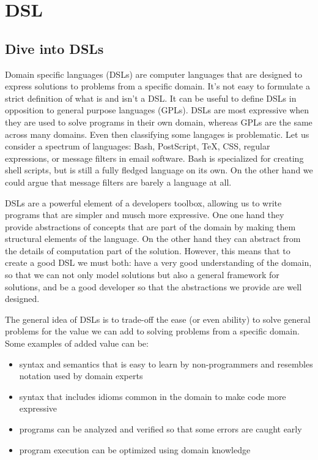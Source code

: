 \chapter{DSL}

\section{Dive into DSLs}

Domain specific languages (DSLs) are computer languages that are designed to express solutions to problems from a specific domain. It's not easy to formulate a strict definition of what is and isn't a DSL. It can be useful to define DSLs in opposition to general purpose languages (GPLs). DSLs are most expressive when they are used to solve programs in their own domain, whereas GPLs are the same across many domains. Even then classifying some langages is problematic. Let us consider a spectrum of languages: Bash, PostScript, TeX, CSS, regular expressions, or message filters in email software. Bash is specialized for creating shell scripts, but is still a fully fledged language on its own. On the other hand we could argue that message filters are barely a language at all.

DSLs are a powerful element of a developers toolbox, allowing us to write programs that are simpler and musch more expressive. One one hand they provide abstractions of concepts that are part of the domain by making them structural elements of the language. On the other hand they can abstract from the details of computation part of the solution. However, this means that to create a good DSL we must both: have a very good understanding of the domain, so that we can not only model solutions but also a general framework for solutions, and be a good developer so that the abstractions we provide are well designed.

The general idea of DSLs is to trade-off the ease (or even ability) to solve general problems for the value we can add to solving problems from a specific domain. Some examples of added value can be:
\begin{itemize}
	\item syntax and semantics that is easy to learn by non-programmers and resembles notation used by domain experts
	\item syntax that includes idioms common in the domain to make code more expressive
	\item programs can be analyzed and verified so that some errors are caught early
	\item program execution can be optimized using domain knowledge
\end{itemize}

